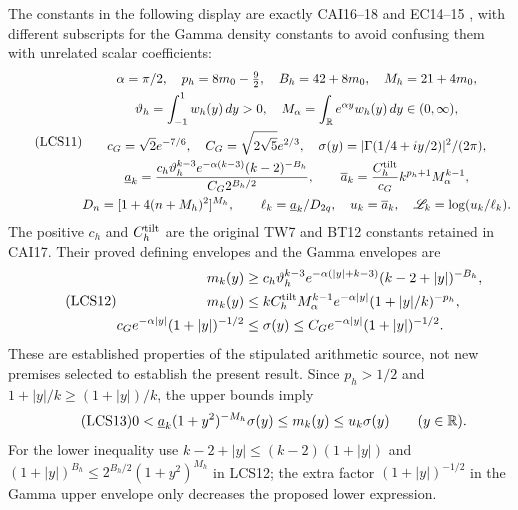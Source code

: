 \documentclass[11pt,a4paper]{article}
\begin{document}
The constants in the following display are exactly CAI16--18 and
EC14--15 \cite{a04lcs:cai,a04lcs:ec}, with different subscripts for the Gamma
density constants to avoid confusing them with unrelated scalar
coefficients:
\begin{equation}\tag{LCS11}
\begin{gathered}
 \alpha=\pi/2,\quad p_h=8m_0-\tfrac92,\quad B_h=42+8m_0,
 \quad M_h=21+4m_0,\\
 \vartheta_h=\int_{-1}^1w_h(y)\,dy>0,\quad
 M_\alpha=\int_\mathbb R e^{\alpha y}w_h(y)\,dy\in(0,\infty),\\
 c_G=\sqrt2e^{-7/6},\quad C_G=\sqrt{2\sqrt5}e^{2/3},\quad
 \sigma(y)=|\Gamma(1/4+iy/2)|^2/(2\pi),\\
 \underline a_k=
 \frac{c_h\vartheta_h^{k-3}e^{-\alpha(k-3)}(k-2)^{-B_h}}
      {C_G2^{B_h/2}},\qquad
 \overline a_k=\frac{C_h^{\rm tilt}}{c_G}
       k^{p_h+1}M_\alpha^{k-1},\\
 D_n=[1+4(n+M_h)^2]^{M_h},\qquad
 \ell_k=\underline a_k/D_{2q},\quad
 u_k=\overline a_k,\quad \mathscr L_k=\log(u_k/\ell_k).
\end{gathered}
\end{equation}
The positive $c_h$ and $C_h^{\rm tilt}$ are the original TW7 and
BT12 constants retained in CAI17. Their proved defining envelopes
and the Gamma envelopes are
\begin{equation}\tag{LCS12}
\begin{aligned}
 m_k(y)&\ge c_h\vartheta_h^{k-3}
       e^{-\alpha(|y|+k-3)}(k-2+|y|)^{-B_h},\\
 m_k(y)&\le kC_h^{\rm tilt}M_\alpha^{k-1}
       e^{-\alpha|y|}(1+|y|/k)^{-p_h},\\
 c_Ge^{-\alpha|y|}(1+|y|)^{-1/2}
       &\le\sigma(y)\le C_Ge^{-\alpha|y|}(1+|y|)^{-1/2}.
\end{aligned}
\end{equation}
These are established properties of the stipulated arithmetic
source, not new premises selected to establish the present result.
Since $p_h>1/2$ and $1+|y|/k\ge(1+|y|)/k$, the upper bounds imply
\begin{equation}\tag{LCS13}
 0<\underline a_k(1+y^2)^{-M_h}\sigma(y)
       \le m_k(y)\le u_k\sigma(y)\qquad(y\in\mathbb R).
\end{equation}
For the lower inequality use
$k-2+|y|\le(k-2)(1+|y|)$ and
$(1+|y|)^{B_h}\le2^{B_h/2}(1+y^2)^{M_h}$ in LCS12;
the extra factor $(1+|y|)^{-1/2}$ in the Gamma upper envelope
only decreases the proposed lower expression.
\end{document}
